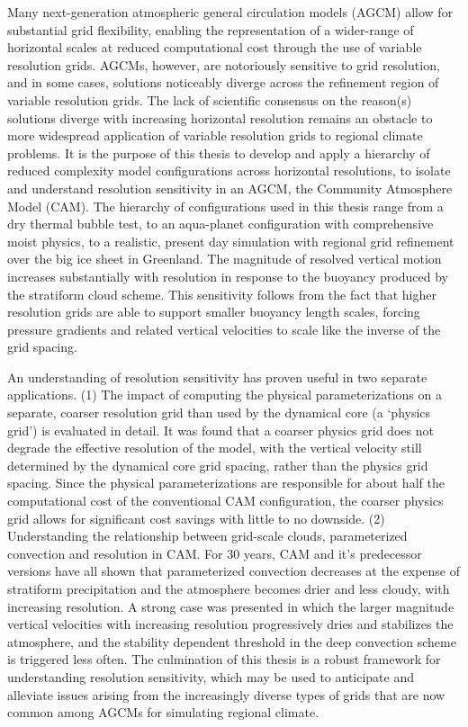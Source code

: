 Many next-generation atmospheric general circulation models (AGCM) allow for substantial grid flexibility, enabling the representation of a wider-range of horizontal scales at reduced computational cost through the use of variable resolution grids. AGCMs, however, are notoriously sensitive to grid resolution, and in some cases, solutions noticeably diverge across the refinement region of variable resolution grids. The lack of scientific consensus on the reason(s) solutions diverge with increasing horizontal resolution remains an obstacle to more widespread application of variable resolution grids to regional climate problems. It is the purpose of this thesis to develop and apply a hierarchy of reduced complexity model configurations across horizontal resolutions, to isolate and understand resolution sensitivity in an AGCM, the Community Atmosphere Model (CAM). The hierarchy of configurations used in this thesis range from a dry thermal bubble test, to an aqua-planet configuration with comprehensive moist physics, to a realistic, present day simulation with regional grid refinement over the big ice sheet in Greenland. The magnitude of resolved vertical motion increases substantially with resolution in response to the buoyancy produced by the stratiform cloud scheme. This sensitivity follows from the fact that higher resolution grids are able to support smaller buoyancy length scales, forcing pressure gradients and related vertical velocities to scale like the inverse of the grid spacing.

An understanding of resolution sensitivity has proven useful in two separate applications. (1) The impact of computing the physical parameterizations on a separate, coarser resolution grid than used by the dynamical core (a `physics grid') is evaluated in detail. It was found that a coarser physics grid does not degrade the effective resolution of the model, with the vertical velocity still determined by the dynamical core grid spacing, rather than the physics grid spacing. Since the physical parameterizations are responsible for about half the computational cost of the conventional CAM configuration, the coarser physics grid allows for significant cost savings with little to no downside. (2) Understanding the relationship between grid-scale clouds, parameterized convection and resolution in CAM. For 30 years, CAM and it's predecessor versions have all shown that parameterized convection decreases at the expense of stratiform precipitation and the atmosphere becomes drier and less cloudy, with increasing resolution. A strong case was presented in which the larger magnitude vertical velocities with increasing resolution progressively dries and stabilizes the atmosphere, and the stability dependent threshold in the deep convection scheme is triggered less often. The culmination of this thesis is a robust framework for understanding resolution sensitivity, which may be used to anticipate and alleviate issues arising from the increasingly diverse types of grids that are now common among AGCMs for simulating regional climate.